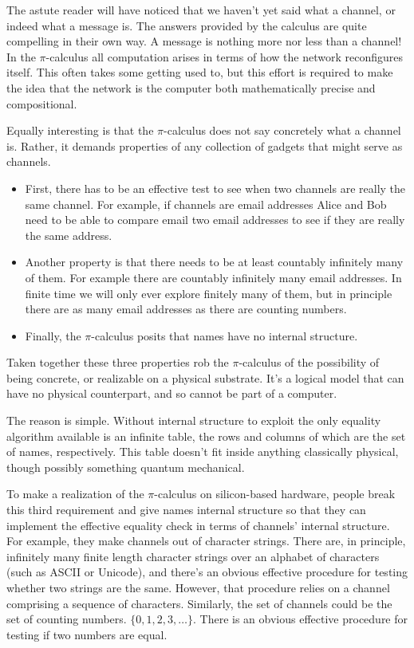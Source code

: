 \documentclass{article}
\begin{document}
The astute reader will have noticed that we haven't yet said what a channel, or indeed what a message is. The answers provided by the calculus are quite compelling in their own way. A message is nothing more nor less than a channel! In the $\pi$-calculus all computation arises in terms of how the network reconfigures itself. This often takes some getting used to, but this effort is required to make the idea that the network is the computer both mathematically precise and compositional.

\medskip

Equally interesting is that the $\pi$-calculus does not say concretely what a channel is. Rather, it demands properties of any collection of gadgets that might serve as channels.
\begin{itemize}
    \item First, there has to be an effective test to see when two channels are really the same channel. For example, if channels are email addresses Alice and Bob need to be able to compare email two email addresses to see if they are really the same address.
    \item Another property is that there needs to be at least countably infinitely many of them. For example there are countably infinitely many email addresses. In finite time we will only ever explore finitely many of them, but in principle there are as many email addresses as there are counting numbers.
    \item Finally, the $\pi$-calculus posits that names have no internal structure.
\end{itemize}

Taken together these three properties rob the $\pi$-calculus of the possibility of being concrete, or realizable on a physical substrate. It's a logical model that can have no physical counterpart, and so cannot be part of a computer.

\medskip

The reason is simple. Without internal structure to exploit the only equality algorithm available is an infinite table, the rows and columns of which are the set of names, respectively. This table doesn't fit inside anything classically physical, though possibly something quantum mechanical.

\medskip

To make a realization of the $\pi$-calculus on silicon-based hardware, people break this third requirement and give names internal structure so that they can implement the effective equality check in terms of channels' internal structure. For example, they make channels out of character strings. There are, in principle, infinitely many finite length character strings over an alphabet of characters (such as ASCII or Unicode), and there's an obvious effective procedure for testing whether two strings are the same. However, that procedure relies on a channel comprising a sequence of characters. Similarly, the set of channels could be the set of counting numbers. $\{ 0, 1, 2, 3, \dots \}$. There is an obvious effective procedure for testing if two numbers are equal.
\end{document}
